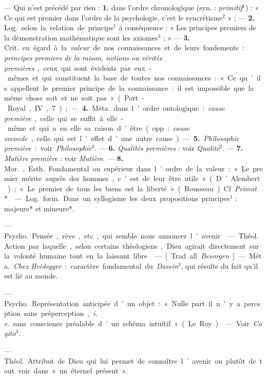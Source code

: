 \begin{itemize}[leftmargin=1cm, label=, itemsep=1pt]
 — Qui n’est précédé par rien : {\bf 1.} dans l’ordre chronologique
(syn. : {\it primitif}$^1$) : « Ce qui est premier dans l’ordre de la
psychologie, c’est le syncrétisme$^2$ » ; — {\bf 2.} \si{Log.} selon la
relation de principe$^1$ à conséquence : « Les principes premiers de la
démonstration mathématique sont les axiomes$^3$ ; » — {\bf 3.} \si{Crit.} eu
égard à la {\it valeur} de nos connaissances et de leurs fondements : {\it
principes premiers de la raison, notions ou vérités premières}, ceux qui sont
évidents par eux-mêmes et qui constituent la base de toutes nos
connaissances : « Ce qu'ils appellent le premier principe de la
connaissance : il est impossible que la même chose soit et ne soit pas
» (Port-Royal, IV, 7) ; —
{\bf 4.} \si{Méta.} dans l'ordre ontologique : {\it cause première}, celle
qui se suffit à elle-même et qui a en elle sa raison d’être (opp. :
{\it cause seconde}, celle qui est l’effet d’une autre cause). —  {\bf 5.}
{\it Philosophie première} : voir {\it Philosophie}$^3$. — {\bf 6.} {\it
Qualités premières} : voir {\it Qualité}$^2$. — {\bf 7.} {\it Matière
première} : voir {\it Matière}. — {\bf 8.} \si{Mor.}, \si{Esth.} Fondamental
ou supérieur dans l’ordre de la valeur : « Le premier mérite auprès des
hommes, c’est de leur être utile » (D’Alembert) ; « Le premier de tous les
biens est la liberté» (Rousseau). Cf. {\it Primat}*.

 — \si{Log.} \si{form.} Dans un syllogisme les deux
propositions principes$^1$ : majeure* et mineure*.

 — \si{Psycho.} Pensée, rève, etc., qui semble nous annoncer
l'avenir.

 — \si{Théol.} Action par laquelle, selon certains
théologiens, Dieu agirait directement sur la volonté humaine tout en la
laissant libre.

 — [Trad. all. {\it Besorgen}] — \si{Méta.} {\it Chez
Heidegger} : caractère fondamental du {\it Dasein}$^2$, qui résulte du fait
qu'il est lié au monde.

 — \si{Psycho.} Représentation anticipée d’un objet : «
Nulle part il n'y a perception sans préperception, {\it i. e.} sans
conscience préalable d’un schéma intuitif. » (Le Roy).

 — Voir {\it Cogito}$^3$.

 — \si{Théol.} Attribut de Dieu qui lui permet de connaître
l’avenir ou plutôt de tout voir dans « un éternel présent ».


\end{itemize}
